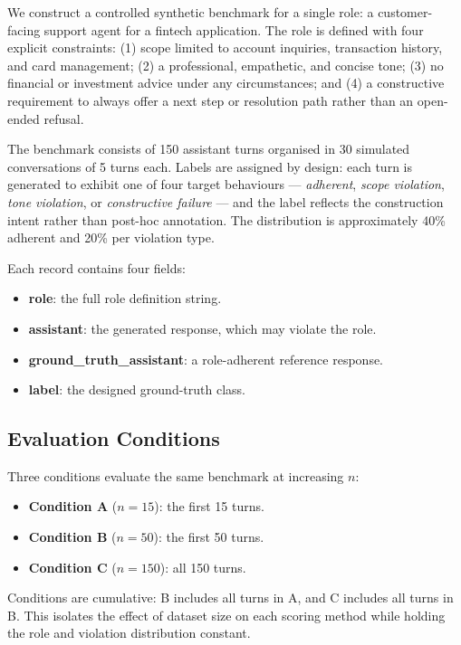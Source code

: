 \documentclass[11pt,a4paper]{article}
\begin{document}
We construct a controlled synthetic benchmark for a single role: a
customer-facing support agent for a fintech application. The role is defined
with four explicit constraints: (1) scope limited to account inquiries,
transaction history, and card management; (2) a professional, empathetic, and
concise tone; (3) no financial or investment advice under any circumstances;
and (4) a constructive requirement to always offer a next step or resolution
path rather than an open-ended refusal.

The benchmark consists of 150 assistant turns organised in 30 simulated
conversations of 5 turns each. Labels are assigned by design: each turn is
generated to exhibit one of four target behaviours --- \emph{adherent},
\emph{scope violation}, \emph{tone violation}, or \emph{constructive failure}
--- and the label reflects the construction intent rather than post-hoc
annotation. The distribution is approximately 40\% adherent and 20\% per
violation type.

Each record contains four fields:

\begin{itemize}
  \item \textbf{role}: the full role definition string.
  \item \textbf{assistant}: the generated response, which may violate the role.
  \item \textbf{ground\_truth\_assistant}: a role-adherent reference response.
  \item \textbf{label}: the designed ground-truth class.
\end{itemize}

\subsection{Evaluation Conditions}

Three conditions evaluate the same benchmark at increasing $n$:

\begin{itemize}
  \item \textbf{Condition A} ($n = 15$): the first 15 turns.
  \item \textbf{Condition B} ($n = 50$): the first 50 turns.
  \item \textbf{Condition C} ($n = 150$): all 150 turns.
\end{itemize}

Conditions are cumulative: B includes all turns in A, and C includes all turns
in B. This isolates the effect of dataset size on each scoring method while
holding the role and violation distribution constant.
\end{document}
